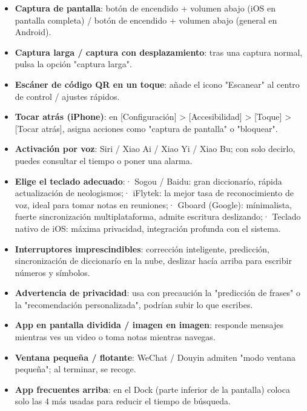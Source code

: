 
\begin{itemize}
  \item \textbf{Captura de pantalla}: botón de encendido + volumen abajo (iOS en pantalla completa) / botón de encendido + volumen abajo (general en Android).
  \item \textbf{Captura larga / captura con desplazamiento}: tras una captura normal, pulsa la opción "captura larga".
  \item \textbf{Escáner de código QR en un toque}: añade el icono "Escanear" al centro de control / ajustes rápidos.
  \item \textbf{Tocar atrás (iPhone)}: en [Configuración] > [Accesibilidad] > [Toque] > [Tocar atrás], asigna acciones como "captura de pantalla" o "bloquear".
  \item \textbf{Activación por voz}: Siri / Xiao Ai / Xiao Yi / Xiao Bu; con solo decirlo, puedes consultar el tiempo o poner una alarma.
\end{itemize}


\begin{itemize}
  \item \textbf{Elige el teclado adecuado}:\newline · Sogou / Baidu: gran diccionarío, rápida actualización de neologismos;\newline · iFlytek: la mejor tasa de reconocimiento de voz, ideal para tomar notas en reuniones;\newline · Gboard (Google): mínimalista, fuerte sincronización multiplataforma, admite escritura deslizando;\newline · Teclado nativo de iOS: máxima privacidad, integración profunda con el sistema.
  \item \textbf{Interruptores imprescindibles}: corrección inteligente, predicción, sincronización de diccionarío en la nube, deslizar hacía arriba para escribir números y símbolos.
  \item \textbf{Advertencia de privacidad}: usa con precaución la "predicción de frases" o la "recomendación personalizada", podrían subir lo que escribes.
\end{itemize}


\begin{itemize}
  \item \textbf{App en pantalla dividida / imagen en imagen}: responde mensajes mientras ves un video o toma notas mientras navegas.
  \item \textbf{Ventana pequeña / flotante}: WeChat / Douyin admiten "modo ventana pequeña"; al terminar, se recoge.
  \item \textbf{App frecuentes arriba}: en el Dock (parte inferior de la pantalla) coloca solo las 4 más usadas para reducir el tiempo de búsqueda.
\end{itemize}

